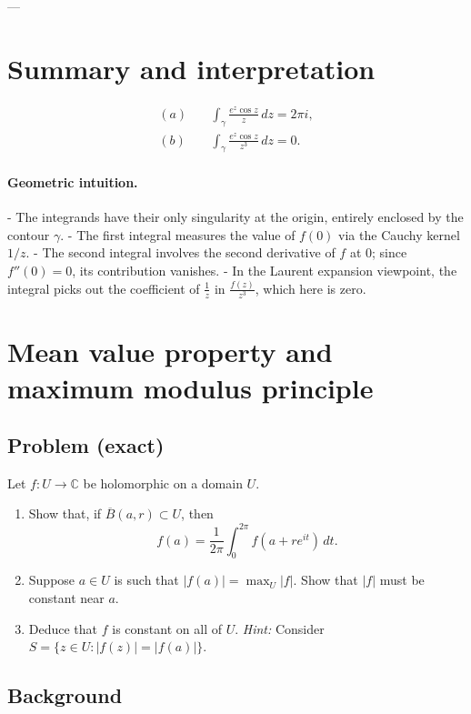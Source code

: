 \documentclass[11pt]{article}
\begin{document}
	---
	
	\section*{Summary and interpretation}
	
	\[
	\boxed{
		\begin{aligned}
			(a)\quad &\int_{\gamma}\frac{e^{z}\cos z}{z}\,dz = 2\pi i,\\[4pt]
			(b)\quad &\int_{\gamma}\frac{e^{z}\cos z}{z^{3}}\,dz = 0.
		\end{aligned}
	}
	\]
	
	\paragraph{Geometric intuition.}
	- The integrands have their only singularity at the origin, entirely enclosed by the contour $\gamma$.
	- The first integral measures the value of $f(0)$ via the Cauchy kernel $1/z$.
	- The second integral involves the second derivative of $f$ at $0$; since $f''(0)=0$, its contribution vanishes.
	- In the Laurent expansion viewpoint, the integral picks out the coefficient of $\frac{1}{z}$ in $\frac{f(z)}{z^{3}}$, which here is zero.
	
	
\section*{Mean value property and maximum modulus principle}

\subsection*{Problem (exact)}
Let $f:U\to\mathbb{C}$ be holomorphic on a domain $U$.
\begin{enumerate}
	\item[(a)] Show that, if $\overline{B}(a,r)\subset U$, then
	\[
	f(a)=\frac{1}{2\pi}\int_{0}^{2\pi} f(a+re^{it})\,dt.
	\]
	\item[(b)] Suppose $a\in U$ is such that $|f(a)|=\max_{U}|f|$. Show that $|f|$ must be constant near $a$.
	\item[(c)] Deduce that $f$ is constant on all of $U$.
	\quad\emph{Hint:} Consider $S=\{z\in U: |f(z)|=|f(a)|\}$.
\end{enumerate}

\subsection*{Background}
\end{document}
